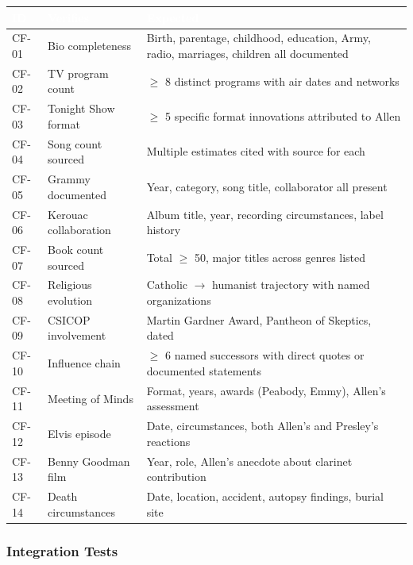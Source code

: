 \documentclass[11pt,letterpaper]{article}
\newcommand{\tableheader}[1]{\textbf{\sffamily\textcolor{white}{#1}}}
\begin{document}
\begin{center}
\begin{tabularx}{\textwidth}{C{1.2cm}L{3cm}X}
\toprule
{}
\tableheader{ID} & \tableheader{Verifies} & \tableheader{Expected} \\
\midrule
CF-01 & Bio completeness & Birth, parentage, childhood, education, Army, radio, marriages, children all documented \\
CF-02 & TV program count & $\geq$ 8 distinct programs with air dates and networks \\
CF-03 & Tonight Show format & $\geq$ 5 specific format innovations attributed to Allen \\
CF-04 & Song count sourced & Multiple estimates cited with source for each \\
CF-05 & Grammy documented & Year, category, song title, collaborator all present \\
CF-06 & Kerouac collaboration & Album title, year, recording circumstances, label history \\
CF-07 & Book count sourced & Total $\geq$ 50, major titles across genres listed \\
CF-08 & Religious evolution & Catholic $\rightarrow$ humanist trajectory with named organizations \\
CF-09 & CSICOP involvement & Martin Gardner Award, Pantheon of Skeptics, dated \\
CF-10 & Influence chain & $\geq$ 6 named successors with direct quotes or documented statements \\
CF-11 & Meeting of Minds & Format, years, awards (Peabody, Emmy), Allen's assessment \\
CF-12 & Elvis episode & Date, circumstances, both Allen's and Presley's reactions \\
CF-13 & Benny Goodman film & Year, role, Allen's anecdote about clarinet contribution \\
CF-14 & Death circumstances & Date, location, accident, autopsy findings, burial site \\
\bottomrule
\end{tabularx}
\end{center}

\subsubsection{Integration Tests}
\end{document}
